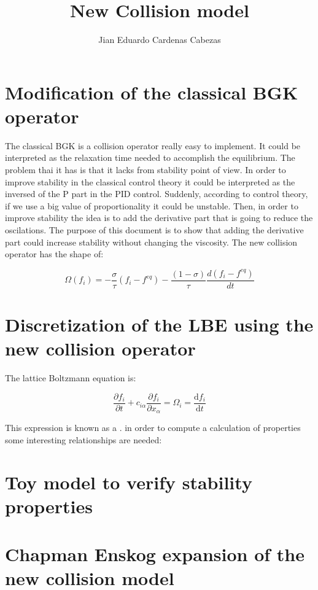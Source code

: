 \documentclass{article}
\title{\textbf{New Collision model}}
\author{Jian Eduardo Cardenas Cabezas}
\begin{document}
\maketitle

\section{Modification of the classical BGK operator}
The classical BGK is a collision operator really easy to implement. It could be interpreted as the relaxation time needed to accomplish the equilibrium. The problem thai it has is that it lacks from stability point of view. In order to improve stability
in the classical control theory it could be interpreted as the inversed of the P part in the PID control. Suddenly, according to control theory, if we use a big value of proportionality 
it could be unstable. Then, in order to improve stability the idea is to add the derivative part that is going to reduce the oscilations. The purpose of this document is to  
show that adding the derivative part could increase stability without changing the viscosity.
The new collision operator has the shape of:

\begin{equation}
    \Omega(f_i) = -\frac{\sigma}{\tau}(f_i-f^{eq}) - \frac{(1-\sigma)}{\tau}\frac{d(f_i-f^{eq})}{dt}    
\end{equation}

\section{Discretization of the LBE using the new collision operator}

The lattice Boltzmann equation is: 

\begin{equation}
    \frac{\partial f_{i}}{\partial t} +c_{i\alpha }\frac{\partial f_{i}}{\partial x_{\alpha }} =\Omega _{i} =\frac{\mathrm{d} f_{i}}{\mathrm{d} t}
\end{equation}

This expression is known as a . in order to compute a calculation of properties some interesting relationships are needed:

\section{Toy model to verify stability properties}

\section{Chapman Enskog expansion of the new collision model}
\end{document}
